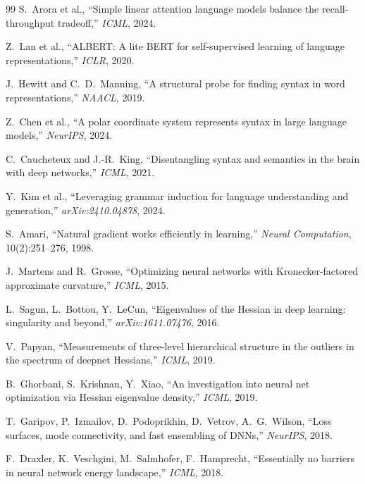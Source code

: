 \documentclass[11pt, a4paper]{article}
\theoremstyle{plain}
\theoremstyle{definition}
\theoremstyle{remark}
\begin{document}
\begin{thebibliography}{99}
S.~Arora et al., ``Simple linear attention language models balance the recall-throughput tradeoff,'' \emph{ICML}, 2024.

Z.~Lan et al., ``ALBERT: A lite BERT for self-supervised learning of language representations,'' \emph{ICLR}, 2020.

J.~Hewitt and C.~D.~Manning, ``A structural probe for finding syntax in word representations,'' \emph{NAACL}, 2019.

Z.~Chen et al., ``A polar coordinate system represents syntax in large language models,'' \emph{NeurIPS}, 2024.

C.~Caucheteux and J.-R.~King, ``Disentangling syntax and semantics in the brain with deep networks,'' \emph{ICML}, 2021.

Y.~Kim et al., ``Leveraging grammar induction for language understanding and generation,'' \emph{arXiv:2410.04878}, 2024.


S.~Amari, ``Natural gradient works efficiently in learning,'' \emph{Neural Computation}, 10(2):251--276, 1998.

J.~Martens and R.~Grosse, ``Optimizing neural networks with Kronecker-factored approximate curvature,'' \emph{ICML}, 2015.

L.~Sagun, L.~Bottou, Y.~LeCun, ``Eigenvalues of the Hessian in deep learning: singularity and beyond,'' \emph{arXiv:1611.07476}, 2016.

V.~Papyan, ``Measurements of three-level hierarchical structure in the outliers in the spectrum of deepnet Hessians,'' \emph{ICML}, 2019.

B.~Ghorbani, S.~Krishnan, Y.~Xiao, ``An investigation into neural net optimization via Hessian eigenvalue density,'' \emph{ICML}, 2019.

T.~Garipov, P.~Izmailov, D.~Podoprikhin, D.~Vetrov, A.~G.~Wilson, ``Loss surfaces, mode connectivity, and fast ensembling of DNNs,'' \emph{NeurIPS}, 2018.

F.~Draxler, K.~Veschgini, M.~Salmhofer, F.~Hamprecht, ``Essentially no barriers in neural network energy landscape,'' \emph{ICML}, 2018.


\end{thebibliography}
\end{document}

